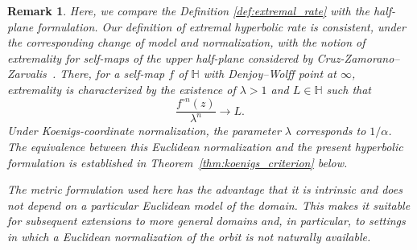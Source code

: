 \documentclass[10pt,a4paper]{amsart}
\numberwithin{equation}{section}
\newtheorem{remark}[equation]{Remark}
\begin{document}
\begin{remark}
\label{rem:cruz_comparison}
Here, we compare the Definition \eqref{def:extremal_rate} with the half-plane formulation.
Our definition of extremal hyperbolic rate is consistent, under the
corresponding change of model and normalization, with the notion of
extremality for self-maps of the upper half-plane considered by
Cruz-Zamorano--Zarvalis~\cite[Definition~3.3]{cruz}. There, for a
self-map $f$ of $\mathbb{H}$ with Denjoy--Wolff point at $\infty$,
extremality is characterized by the existence of $\lambda>1$ and
$L\in\mathbb{H}$ such that
\begin{equation*}
\frac{f^{\circ n}(z)}{\lambda^n}\longrightarrow L.
\end{equation*}
Under Koenigs-coordinate normalization, the parameter $\lambda$
corresponds to $1/\alpha$. The equivalence between this Euclidean normalization and the present hyperbolic formulation is established
in Theorem~\ref{thm:koenigs_criterion} below.

The metric formulation used here has the advantage that it is
intrinsic and does not depend on a particular Euclidean model of the
domain. This makes it suitable for subsequent extensions to more
general domains and, in particular, to settings in which a Euclidean
normalization of the orbit is not naturally available.
\end{remark}
\end{document}
